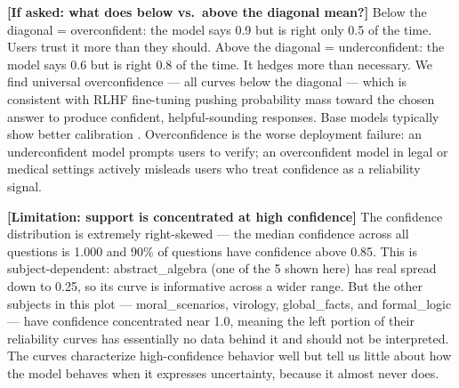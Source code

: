 \documentclass[aspectratio=169,11pt]{beamer}
\begin{document}
{  \textbf{[If asked: what does below vs.\ above the diagonal mean?]}
  Below the diagonal = overconfident: the model says 0.9 but is right only 0.5 of
  the time. Users trust it more than they should.
  Above the diagonal = underconfident: the model says 0.6 but is right 0.8 of the
  time. It hedges more than necessary.
  We find universal overconfidence — all curves below the diagonal — which is
  consistent with RLHF fine-tuning pushing probability mass toward the chosen answer
  to produce confident, helpful-sounding responses. Base models typically show
  better calibration \citep{kadavath2022language, nakkiran2025trained}.
  Overconfidence is the worse deployment failure: an underconfident model prompts
  users to verify; an overconfident model in legal or medical settings actively
  misleads users who treat confidence as a reliability signal.

  \textbf{[Limitation: support is concentrated at high confidence]}
  The confidence distribution is extremely right-skewed — the median confidence
  across all questions is 1.000 and 90\% of questions have confidence above 0.85.
  This is subject-dependent: abstract\_algebra (one of the 5 shown here) has real
  spread down to 0.25, so its curve is informative across a wider range. But the
  other subjects in this plot --- moral\_scenarios, virology, global\_facts, and
  formal\_logic --- have confidence concentrated near 1.0, meaning the left portion
  of their reliability curves has essentially no data behind it and should not be
  interpreted.
  The curves characterize high-confidence behavior well but tell us little about
  how the model behaves when it expresses uncertainty, because it almost never does.
}

\end{document}
